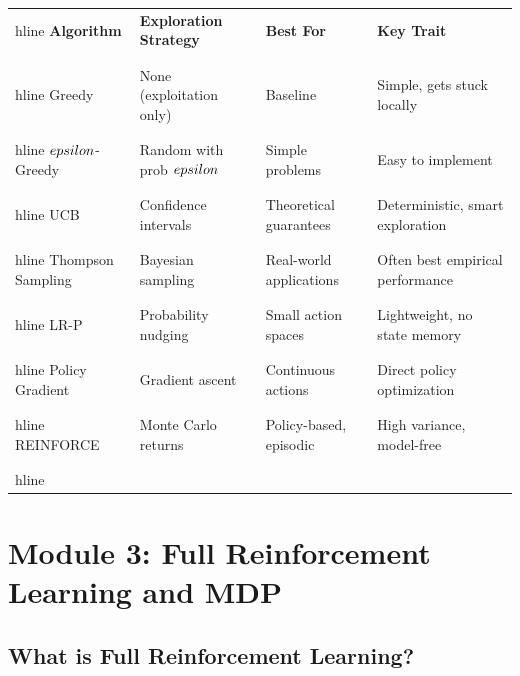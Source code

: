 \documentclass[11pt,a4paper]{article}
\begin{document}
\begin{center}
\begin{tabular}{|l|l|l|l|}
\\hline
\textbf{Algorithm} & \textbf{Exploration Strategy} & \textbf{Best For} & \textbf{Key Trait} \\\\ \\hline
Greedy & None (exploitation only) & Baseline & Simple, gets stuck locally \\\\ \\hline
$\\epsilon$-Greedy & Random with prob $\\epsilon$ & Simple problems & Easy to implement \\\\ \\hline
UCB & Confidence intervals & Theoretical guarantees & Deterministic, smart exploration \\\\ \\hline
Thompson Sampling & Bayesian sampling & Real-world applications & Often best empirical performance \\\\ \\hline
LR-P & Probability nudging & Small action spaces & Lightweight, no state memory \\\\ \\hline
Policy Gradient & Gradient ascent & Continuous actions & Direct policy optimization \\\\ \\hline
REINFORCE & Monte Carlo returns & Policy-based, episodic & High variance, model-free \\\\ \\hline
\end{tabular}
\end{center}


\section{Module 3: Full Reinforcement Learning and MDP}

\subsection{What is Full Reinforcement Learning?}
\end{document}

